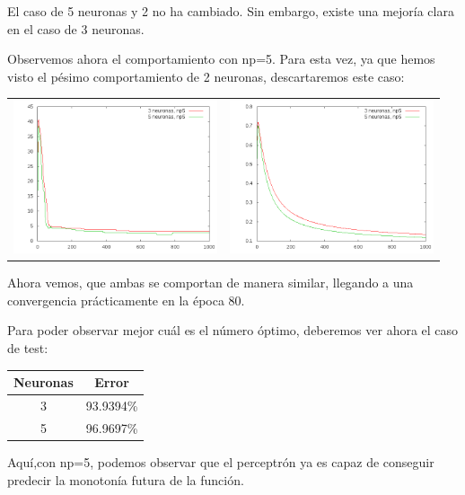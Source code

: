 \documentclass[12pt]{article}
\begin{document}
El caso de 5 neuronas y 2 no ha cambiado. Sin embargo, existe una mejoría clara en el caso de 3 neuronas.

Observemos ahora el comportamiento con np=5. Para esta vez, ya que hemos visto el pésimo comportamiento de 2 neuronas, descartaremos este caso:

\begin{center}
   \begin{tabular}{ c  c }
     \includegraphics[width=6cm]{graficosparte2a/error_train_np5} &
     \includegraphics[width=6cm]{graficosparte2a/ecm_train_np5}\\ 
   \end{tabular}
 \end{center}

Ahora vemos, que ambas se comportan de manera similar, llegando a una convergencia prácticamente en la época 80.

Para poder observar mejor cuál es el número óptimo, deberemos ver ahora el caso de test:

\begin{center}
	\begin{tabular}{| c | c |}
		\hline
		Neuronas & Error \\ \hline
		3 & 93.9394\% \\ \hline
		5 & 96.9697\% \\ \hline
	\end{tabular}
\end{center}

Aquí,con np=5, podemos observar que el perceptrón ya es capaz de conseguir predecir la monotonía futura de la función.
\end{document}

